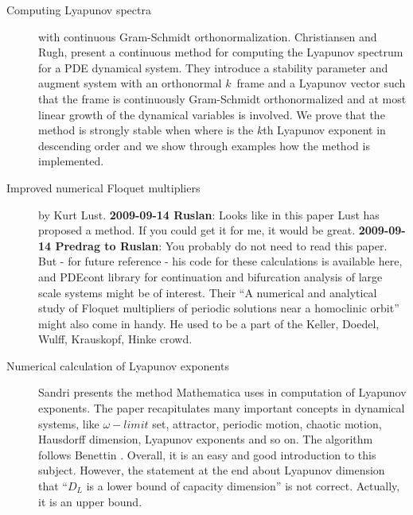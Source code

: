 \begin{description}
\item[Computing {L}yapunov spectra] with continuous
         {Gram-Schmidt} orthonormalization.
Christiansen and Rugh,
present a
  continuous method for computing the Lyapunov
  spectrum for a PDE dynamical system. They introduce a
  stability parameter and augment system with
  an orthonormal $k$\dmn\ frame and a Lyapunov vector such
  that the frame is continuously Gram-Schmidt orthonormalized
  and at most linear growth of the dynamical variables is
  involved. We prove that the method is strongly stable when
  where is the $k$th Lyapunov exponent in descending order and we
  show through examples how the method is implemented.

\item[Improved numerical Floquet
multipliers] by
     {Kurt Lust}.  {\bf 2009-09-14 Ruslan}:
Looks like  in this paper {Lust} has proposed a method. If you
could get it for me, it would be great. {\bf 2009-09-14 Predrag
to Ruslan}: You probably do not need to read this paper.
But - for future reference - his
     code for these calculations is
     {available here}, and
     {PDEcont library}  for continuation and bifurcation analysis
      of large scale systems might be of interest.
Their ``A numerical and analytical study of Floquet
        multipliers of periodic solutions near
        a homoclinic orbit''
might also come in handy.
He used to be a part of the Keller, Doedel, Wulff, Krauskopf,
Hinke crowd.

\item[Numerical calculation of Lyapunov exponents]
Sandri presents the method Mathematica uses in computation
of Lyapunov exponents. The paper recapitulates many important concepts in
dynamical systems, like $\omega-limit$ set, attractor, periodic motion,
chaotic motion, Hausdorff dimension, Lyapunov exponents and so on. The
algorithm follows Benettin \etal{}. Overall, it is an easy and
good introduction to this subject. However, the statement at the end
about Lyapunov dimension that ``$D_L$ is a lower bound of capacity
dimension'' is not correct. Actually, it is an upper bound.


\end{description}
